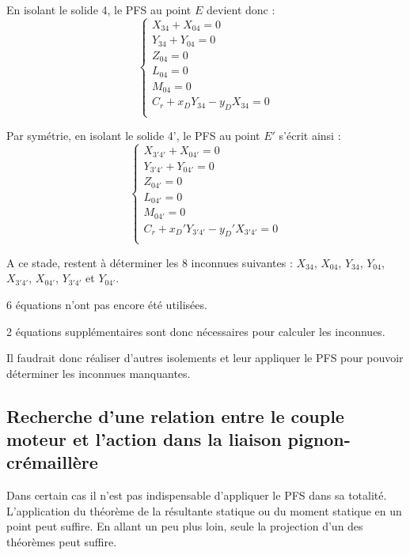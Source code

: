\documentclass[10pt]{article}
\begin{document}
\vspace{.5cm}
\begin{minipage}[c]{.45\linewidth}
En isolant le solide 4, le PFS au point $E$ devient donc : 
$$
\left\{
\begin{array}{l}
{X_{34}}+{X_{04}}=0 \\
{Y_{34}}+{Y_{04}}=0 \\
{Z_{04}}=0 \\
{L_{04}}=0\\
{M_{04}}=0\\
{C_r}+{x_DY_{34}-y_DX_{34}}=0 \\
\end{array}
\right.
$$

\end{minipage} \hfill
\begin{minipage}[c]{.45\linewidth}
Par symétrie, en isolant le solide 4', le PFS au point $E'$ s'écrit ainsi : 
$$
\left\{
\begin{array}{l}
{X_{3'4'}}+{X_{04'}}=0 \\
{Y_{3'4'}}+{Y_{04'}}=0 \\
{Z_{04'}}=0 \\
{L_{04'}}=0\\
{M_{04'}}=0\\
{C_r}+{x_D'Y_{3'4'}-y_D'X_{3'4'}}=0 \\
\end{array}
\right.
$$

\end{minipage}


\begin{rem}
A ce stade, restent à déterminer les 8 inconnues suivantes : $X_{34}$, $X_{04}$, $Y_{34}$, $Y_{04}$, $X_{3'4'}$, $X_{04'}$, $Y_{3'4'}$ et $Y_{04'}$.

6 équations n'ont pas encore été utilisées.

2 équations supplémentaires sont donc nécessaires pour calculer les inconnues. 

Il faudrait donc réaliser d'autres isolements et leur appliquer le PFS pour pouvoir déterminer les inconnues manquantes.
\end{rem}



\subsection{Recherche d'une relation entre le couple moteur et l'action dans la liaison pignon-crémaillère}

Dans certain cas il n'est pas indispensable d'appliquer le PFS dans sa totalité. L'application du théorème de la résultante statique ou du moment statique en un point peut suffire. En allant un peu plus loin, seule la projection d'un des théorèmes peut suffire.
\end{document}
